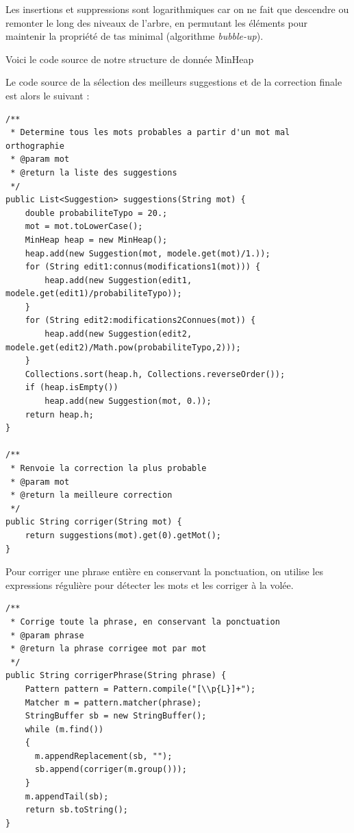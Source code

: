 \documentclass[10pt,a4paper]{article}
\begin{document}
Les insertions et suppressions sont logarithmiques car on ne fait que descendre ou remonter le long des niveaux de l'arbre, en permutant les éléments pour maintenir la propriété de tas minimal (algorithme \textit{bubble-up}).

Voici le code source de notre structure de donnée MinHeap



Le code source de la sélection des meilleurs suggestions et de la correction finale est alors le suivant : 

\begin{lstlisting}
/**
 * Determine tous les mots probables a partir d'un mot mal orthographie
 * @param mot
 * @return la liste des suggestions
 */
public List<Suggestion> suggestions(String mot) {
    double probabiliteTypo = 20.;
    mot = mot.toLowerCase();
    MinHeap heap = new MinHeap();
    heap.add(new Suggestion(mot, modele.get(mot)/1.));        
    for (String edit1:connus(modifications1(mot))) {
        heap.add(new Suggestion(edit1, modele.get(edit1)/probabiliteTypo));
    }        
    for (String edit2:modifications2Connues(mot)) {
        heap.add(new Suggestion(edit2, modele.get(edit2)/Math.pow(probabiliteTypo,2)));
    }        
    Collections.sort(heap.h, Collections.reverseOrder());
    if (heap.isEmpty())
        heap.add(new Suggestion(mot, 0.));
    return heap.h;
}

/**
 * Renvoie la correction la plus probable
 * @param mot
 * @return la meilleure correction
 */
public String corriger(String mot) {
    return suggestions(mot).get(0).getMot();
}
\end{lstlisting}

Pour corriger une phrase entière en conservant la ponctuation, on utilise les expressions régulière pour détecter les mots et les corriger à la volée.

\begin{lstlisting}
/**
 * Corrige toute la phrase, en conservant la ponctuation
 * @param phrase
 * @return la phrase corrigee mot par mot
 */
public String corrigerPhrase(String phrase) {
    Pattern pattern = Pattern.compile("[\\p{L}]+");
    Matcher m = pattern.matcher(phrase);
    StringBuffer sb = new StringBuffer();  
    while (m.find())
    {  
      m.appendReplacement(sb, "");  
      sb.append(corriger(m.group()));
    }  
    m.appendTail(sb);  
    return sb.toString(); 
}
\end{lstlisting}
\end{document}
